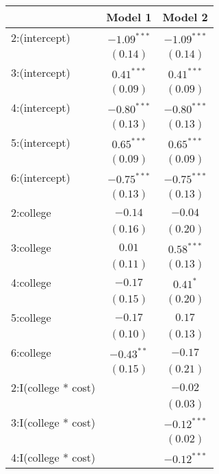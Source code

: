 
\begin{table}
\tiny
\begin{center}
\begin{tabular}{l c c }
\hline
 & Model 1 & Model 2 \\
\hline
2:(intercept)       & $-1.09^{***}$ & $-1.09^{***}$ \\
                    & $(0.14)$      & $(0.14)$      \\
3:(intercept)       & $0.41^{***}$  & $0.41^{***}$  \\
                    & $(0.09)$      & $(0.09)$      \\
4:(intercept)       & $-0.80^{***}$ & $-0.80^{***}$ \\
                    & $(0.13)$      & $(0.13)$      \\
5:(intercept)       & $0.65^{***}$  & $0.65^{***}$  \\
                    & $(0.09)$      & $(0.09)$      \\
6:(intercept)       & $-0.75^{***}$ & $-0.75^{***}$ \\
                    & $(0.13)$      & $(0.13)$      \\
2:college           & $-0.14$       & $-0.04$       \\
                    & $(0.16)$      & $(0.20)$      \\
3:college           & $0.01$        & $0.58^{***}$  \\
                    & $(0.11)$      & $(0.13)$      \\
4:college           & $-0.17$       & $0.41^{*}$    \\
                    & $(0.15)$      & $(0.20)$      \\
5:college           & $-0.17$       & $0.17$        \\
                    & $(0.10)$      & $(0.13)$      \\
6:college           & $-0.43^{**}$  & $-0.17$       \\
                    & $(0.15)$      & $(0.21)$      \\
2:I(college * cost) &               & $-0.02$       \\
                    &               & $(0.03)$      \\
3:I(college * cost) &               & $-0.12^{***}$ \\
                    &               & $(0.02)$      \\
4:I(college * cost) &               & $-0.12^{***}$ \\

\end{tabular}
\end{center}
\end{table}
